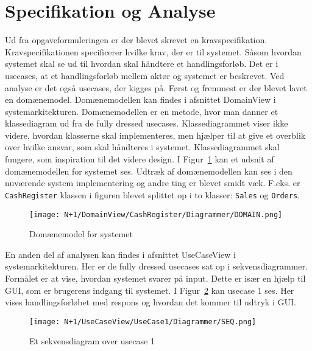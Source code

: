 \section{Specifikation og Analyse}
\label{sec:specandanal}
Ud fra opgaveformuleringen er der blevet skrevet en kravspecifikation. Kravspecifikationen specificerer hvilke krav, der er til \gls{system}et. Såsom hvordan \gls{system}et skal se ud til hvordan skal håndtere et handlingsforløb. Det er i \gls{usecase}s, at et handlingsforløb mellem aktør og \gls{system}et er beskrevet. Ved analyse er det også \gls{usecase}s, der kigges på.
\newline\newline
Først og fremmest er der blevet lavet en domænemodel. Domænemodellen kan findes i afsnittet DomainView i systemarkitekturen. Domænemodellen er en metode, hvor man danner et klassediagram ud fra de fully dressed \gls{usecase}s. Klassediagrammet viser ikke videre, hvordan klasserne skal implementeres, men hjælper til at give et overblik over hvilke ansvar, som skal håndteres i \gls{system}et. Klassediagrammet skal fungere, som inspiration til det videre design. 
\newline\newline
I Figur~\ref{fig:domainmodel} kan et udsnit af domænemodellen for \gls{system}et ses. Udtræk af domænemodellen kan ses i den nuværende system implementering og andre ting er blevet smidt væk. F.eks. er \texttt{CashRegister} klassen i figuren blevet splittet op i to klasser: \texttt{Sales} og \texttt{Orders}.

\begin{figure}[H]
	\centering
	\texttt{[image: N+1/DomainView/CashRegister/Diagrammer/DOMAIN.png]}
	\caption{Domænemodel for \Gls{system}et}
	\label{fig:domainmodel}
\end{figure}

En anden del af analysen kan findes i afsnittet UseCaseView i systemarkitekturen. Her er de fully dressed \gls{usecase}s sat op i sekvensdiagrammer. Formålet er at vise, hvordan \gls{system}et svarer på input. Dette er især en hjælp til \gls{GUI}, som er brugerens indgang til systemet. I Figur~\ref{fig:usecaseviewseq} kan \gls{usecase} 1 ses. Her vises handlingsforløbet med respons og hvordan det kommer til udtryk i \gls{GUI}.

\begin{figure}[H]
	\centering
	\texttt{[image: N+1/UseCaseView/UseCase1/Diagrammer/SEQ.png]}
	\caption{Et sekvensdiagram over \gls{usecase} 1}
	\label{fig:usecaseviewseq}
\end{figure}